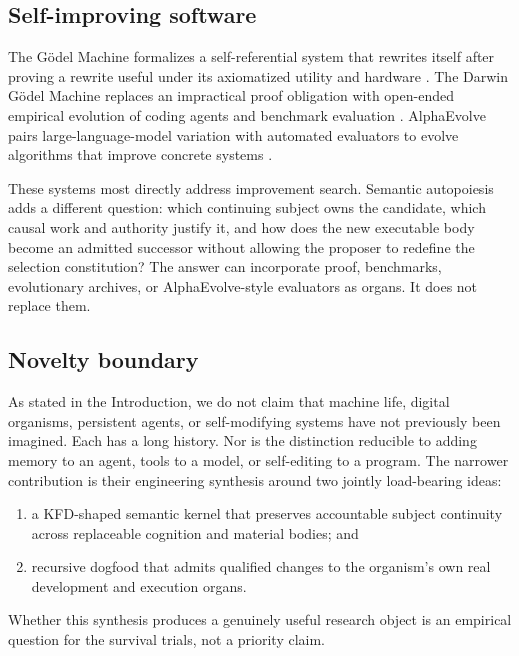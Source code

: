 \subsection{Self-improving software}

The G\"odel Machine formalizes a self-referential system that rewrites itself
after proving a rewrite useful under its axiomatized utility and hardware
\cite{schmidhuber2003goedel}. The Darwin G\"odel Machine replaces an
impractical proof obligation with open-ended empirical evolution of coding
agents and benchmark evaluation \cite{zhang2025dgm}. AlphaEvolve pairs
large-language-model variation with automated evaluators to evolve algorithms
that improve concrete systems \cite{novikov2025alphaevolve}.

These systems most directly address improvement search. Semantic autopoiesis
adds a different question: which continuing subject owns the candidate,
which causal work and authority justify it, and how does the new executable
body become an admitted successor without allowing the proposer to redefine
the selection constitution? The answer can incorporate proof, benchmarks,
evolutionary archives, or AlphaEvolve-style evaluators as organs. It does not
replace them.

\subsection{Novelty boundary}

As stated in the Introduction, we do not claim that machine life, digital
organisms, persistent agents, or self-modifying systems have not previously
been imagined. Each has a long history. Nor is the distinction reducible to
adding memory to an agent, tools to a model, or self-editing to a program. The
narrower contribution is their engineering synthesis around two jointly
load-bearing ideas:

\begin{enumerate}[leftmargin=*]
  \item a KFD-shaped semantic kernel that preserves accountable subject
  continuity across replaceable cognition and material bodies; and
  \item recursive dogfood that admits qualified changes to the organism's own
  real development and execution organs.
\end{enumerate}

Whether this synthesis produces a genuinely useful research object is an
empirical question for the survival trials, not a priority claim.
